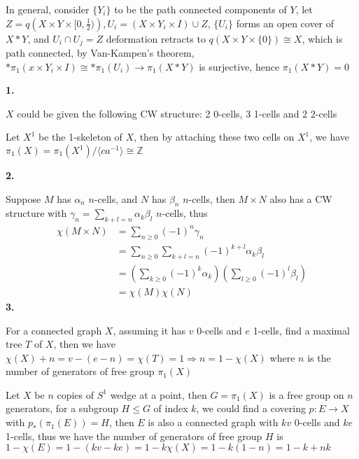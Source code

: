 \documentclass[12pt]{article}
\begin{document}
In general, consider $\{Y_i\}$ to be the path connected components of $Y$, let $Z=q\left(X\times Y\times [0,\frac{1}{2})\right), U_i=(X\times Y_i\times I)\cup Z$, $\{U_i\}$ forms an open cover of $X*Y$, and $U_i\cap U_j=Z$ deformation retracts to $q(X\times Y\times \{0\})\cong X$, which is path connected, by Van-Kampen's theorem, $*\pi_1(x\times Y_i\times I)\cong *\pi_1(U_i)\rightarrow \pi_1(X*Y)$ is surjective, hence $\pi_1(X*Y)=0$ \par
\textbf{1.} \par
$X$ could be given the following CW structure: 2 0-cells, 3 1-cells and 2 2-cells \par
\vspace{1.5cm}
Let $X^1$ be the 1-skeleton of $X$, then by attaching these two cells on $X^1$, we have $\pi_1(X)=\pi_1(X^1)/\langle ca^{-1}\rangle\cong \mathbb{Z}$ \par

\textbf{2.} \par
Suppose $M$ has $\alpha_n$ $n$-cells, and $N$ has $\beta_n$ $n$-cells, then $M\times N$ also has a CW structure with $\displaystyle\gamma_n=\sum_{k+l=n}\alpha_k\beta_l$ $n$-cells, thus
\[
\begin{aligned}
\chi(M\times N)
&=\sum_{n\geq 0}(-1)^n\gamma_n \\
&=\sum_{n\geq 0}\sum_{k+l=n}(-1)^{k+l}\alpha_k\beta_l \\
&=\left(\sum_{k\geq 0}(-1)^k\alpha_k\right)\left(\sum_{l\geq 0}(-1)^l\beta_l\right) \\
&=\chi(M)\chi(N)
\end{aligned}
\]
\textbf{3.} \par
For a connected graph $X$, assuming it has $v$ 0-cells and $e$ 1-cells, find a maximal tree $T$ of $X$, then we have $\chi(X)+n=v-(e-n)=\chi(T)=1\Rightarrow n=1-\chi(X)$ where $n$ is the number of generators of free group $\pi_1(X)$ \par
Let $X$ be $n$ copies of $S^1$ wedge at a point, then $G=\pi_1(X)$ is a free group on $n$ generators, for a subgroup $H\leq G$ of index $k$, we could find a covering $p:E\rightarrow X$ with $p_*(\pi_1(E))=H$, then $E$ is also a connected graph with $kv$ 0-cells and $ke$ 1-cells, thus we have the number of generators of free group $H$ is $1-\chi(E)=1-(kv-ke)=1-k\chi(X)=1-k(1-n)=1-k+nk$ \par
\end{document}
